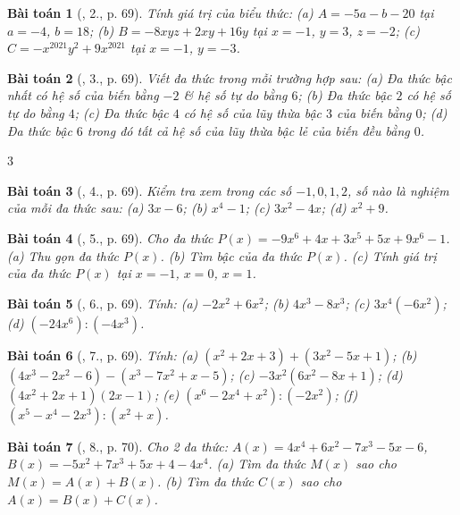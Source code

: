 \documentclass{article}
\newtheorem{baitoan}{Bài toán}
\begin{document}
\begin{baitoan}[\cite{SGK_Toan_7_Canh_Dieu_tap_2}, 2., p. 69]
	Tính giá trị của biểu thức: (a) $A = -5a - b - 20$ tại $a = -4$, $b = 18$; (b) $B = -8xyz + 2xy + 16y$ tại $x = -1$, $y = 3$, $z = -2$; (c) $C = -x^{2021}y^2 + 9x^{2021}$ tại $x = -1$, $y = -3$.
\end{baitoan}

\begin{baitoan}[\cite{SGK_Toan_7_Canh_Dieu_tap_2}, 3., p. 69]
	Viết đa thức trong mỗi trường hợp sau: (a) Đa thức bậc nhất có hệ số của biến bằng $-2$ \& hệ số tự do bằng $6$; (b) Đa thức bậc $2$ có hệ số tự do bằng $4$; (c) Đa thức bậc $4$ có hệ số của lũy thừa bậc $3$ của biến bằng $0$; (d) Đa thức bậc $6$  trong đó tất cả hệ số của lũy thừa bậc lẻ của biến đều bằng $0$. 
\end{baitoan}3

\begin{baitoan}[\cite{SGK_Toan_7_Canh_Dieu_tap_2}, 4., p. 69]
	Kiểm tra xem trong các số $-1,0,1,2$, số nào là nghiệm của mỗi đa thức sau: (a) $3x - 6$; (b) $x^4 - 1$; (c) $3x^2 - 4x$; (d) $x^2 + 9$.
\end{baitoan}

\begin{baitoan}[\cite{SGK_Toan_7_Canh_Dieu_tap_2}, 5., p. 69]
	Cho đa thức $P(x) = -9x^6 + 4x + 3x^5 + 5x + 9x^6 - 1$. (a) Thu gọn đa thức $P(x)$. (b) Tìm bậc của đa thức $P(x)$. (c) Tính giá trị của đa thức $P(x)$ tại $x = -1$, $x = 0$, $x = 1$.
\end{baitoan}

\begin{baitoan}[\cite{SGK_Toan_7_Canh_Dieu_tap_2}, 6., p. 69]
	Tính: (a) $-2x^2 + 6x^2$; (b) $4x^3 - 8x^3$; (c) $3x^4(-6x^2)$; (d) $(-24x^6):(-4x^3)$.
\end{baitoan}

\begin{baitoan}[\cite{SGK_Toan_7_Canh_Dieu_tap_2}, 7., p. 69]
	Tính: (a) $(x^2 + 2x + 3) + (3x^2 - 5x + 1)$; (b) $(4x^3 - 2x^2 - 6) - (x^3 - 7x^2 + x - 5)$; (c) $-3x^2(6x^2 - 8x + 1)$; (d) $(4x^2 + 2x + 1)(2x - 1)$; (e) $(x^6 - 2x^4 + x^2):(-2x^2)$; (f) $(x^5 - x^4 - 2x^3):(x^2 + x)$.
\end{baitoan}

\begin{baitoan}[\cite{SGK_Toan_7_Canh_Dieu_tap_2}, 8., p. 70]
	Cho 2 đa thức: $A(x) = 4x^4 + 6x^2 - 7x^3 - 5x - 6$, $B(x) = -5x^2 + 7x^3 + 5x + 4 - 4x^4$. (a) Tìm đa thức $M(x)$ sao cho $M(x) = A(x) + B(x)$. (b) Tìm đa thức $C(x)$ sao cho $A(x) = B(x) + C(x)$.
\end{baitoan}
\end{document}
